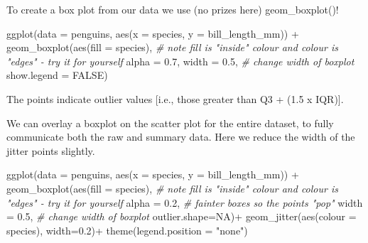 \documentclass[
]{book}
\newenvironment{Shaded}{\begin{snugshade}}{\end{snugshade}}
\newcommand{\AttributeTok}[1]{\textcolor[rgb]{0.77,0.63,0.00}{#1}}
\newcommand{\CommentTok}[1]{\textcolor[rgb]{0.56,0.35,0.01}{\textit{#1}}}
\newcommand{\ConstantTok}[1]{\textcolor[rgb]{0.00,0.00,0.00}{#1}}
\newcommand{\FloatTok}[1]{\textcolor[rgb]{0.00,0.00,0.81}{#1}}
\newcommand{\FunctionTok}[1]{\textcolor[rgb]{0.00,0.00,0.00}{#1}}
\newcommand{\NormalTok}[1]{#1}
\newcommand{\SpecialCharTok}[1]{\textcolor[rgb]{0.00,0.00,0.00}{#1}}
\newcommand{\StringTok}[1]{\textcolor[rgb]{0.31,0.60,0.02}{#1}}
\begin{document}
To create a box plot from our data we use (no prizes here) geom\_boxplot()!

\begin{Shaded}
\begin{Highlighting}[]
\FunctionTok{ggplot}\NormalTok{(}\AttributeTok{data =}\NormalTok{ penguins, }\FunctionTok{aes}\NormalTok{(}\AttributeTok{x =}\NormalTok{ species, }\AttributeTok{y =}\NormalTok{ bill\_length\_mm)) }\SpecialCharTok{+}
  \FunctionTok{geom\_boxplot}\NormalTok{(}\FunctionTok{aes}\NormalTok{(}\AttributeTok{fill =}\NormalTok{ species), }\CommentTok{\# note fill is "inside" colour and colour is "edges" {-} try it for yourself}
              \AttributeTok{alpha =} \FloatTok{0.7}\NormalTok{, }
              \AttributeTok{width =} \FloatTok{0.5}\NormalTok{, }\CommentTok{\# change width of boxplot}
              \AttributeTok{show.legend =} \ConstantTok{FALSE}\NormalTok{)}
\end{Highlighting}
\end{Shaded}

The points indicate outlier values {[}i.e., those greater than Q3 + (1.5 x IQR){]}.

We can overlay a boxplot on the scatter plot for the entire dataset, to fully communicate both the raw and summary data. Here we reduce the width of the jitter points slightly.

\begin{Shaded}
\begin{Highlighting}[]
\FunctionTok{ggplot}\NormalTok{(}\AttributeTok{data =}\NormalTok{ penguins, }\FunctionTok{aes}\NormalTok{(}\AttributeTok{x =}\NormalTok{ species, }\AttributeTok{y =}\NormalTok{ bill\_length\_mm)) }\SpecialCharTok{+}
  \FunctionTok{geom\_boxplot}\NormalTok{(}\FunctionTok{aes}\NormalTok{(}\AttributeTok{fill =}\NormalTok{ species), }\CommentTok{\# note fill is "inside" colour and colour is "edges" {-} try it for yourself}
              \AttributeTok{alpha =} \FloatTok{0.2}\NormalTok{, }\CommentTok{\# fainter boxes so the points "pop"}
              \AttributeTok{width =} \FloatTok{0.5}\NormalTok{, }\CommentTok{\# change width of boxplot}
              \AttributeTok{outlier.shape=}\ConstantTok{NA}\NormalTok{)}\SpecialCharTok{+}
  \FunctionTok{geom\_jitter}\NormalTok{(}\FunctionTok{aes}\NormalTok{(}\AttributeTok{colour =}\NormalTok{ species),}
                \AttributeTok{width=}\FloatTok{0.2}\NormalTok{)}\SpecialCharTok{+}
  \FunctionTok{theme}\NormalTok{(}\AttributeTok{legend.position =} \StringTok{"none"}\NormalTok{)}
\end{Highlighting}
\end{Shaded}
\end{document}

